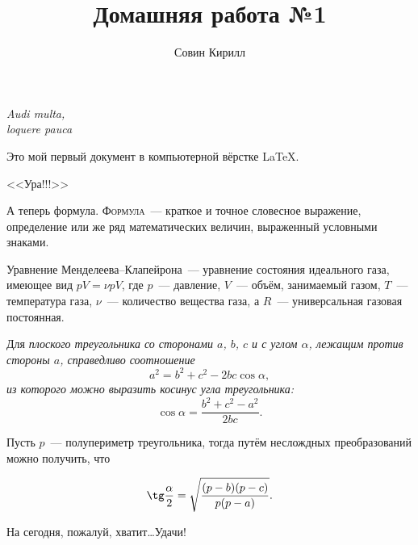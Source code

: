 \documentclass[12pt]{article}
\title{Домашняя работа №1}
\author{Совин Кирилл}
\date{}
\begin{document}
	\maketitle
	\begin{flushright}
		\textit{Audi multa,\\
			loquere pauca}	
	\end{flushright}

	\vspace{20pt}

	Это мой первый документ в компьютерной вёрстке \LaTeX.

	\begin{center}
		\huge \textsf{<<Ура!!!>>} 
	\end{center}

	А теперь формула. \textsc{Формула}~--- краткое и точное словесное выражение, определение или же ряд математических величин, выраженный условными знаками.
	\vspace{15pt}

	\hspace{28pt}

	Уравнение Менделеева--Клапейрона~--- уравнение состояния идеального газа, имеющее вид $pV = \nu pV$, где $p$~--- давление, $V$~--- объём, занимаемый газом, $T$~--- температура газа, $\nu$~--- количество вещества газа, а $R$~--- универсальная газовая постоянная.
	\vspace{15pt}

	\hspace{28pt}
	
	Для \slshape плоского \upshape треугольника со сторонами $a$, $b$, $c$ и с углом $\alpha$, лежащим против стороны $a$, справедливо соотношение
	$$
	a^2 = b^2 + c^2 - 2bc \cos \alpha,
	$$
	из которого можно выразить косинус угла треугольника:
	$$
	\cos \alpha =\frac {b^2 + c^2 - a^2} {2bc}.
	$$

	Пусть $p$~--- полупериметр треугольника, тогда путём неслождных преобразований можно получить, что

	$$
	\tg \frac \alpha 2 = \sqrt{\frac {(p - b)(p - c)} {p(p - a)} }.
	$$
	\vspace{1cm}
	\raggedright На сегодня, пожалуй, хватит\dots Удачи!
\end{document}
